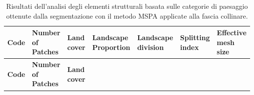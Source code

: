 \documentclass[
  a4paper,
]{book}
\begin{document}
\begin{longtable}[]{@{}
  >{\raggedright\arraybackslash}p{}
  >{\raggedright\arraybackslash}p{}
  >{\raggedright\arraybackslash}p{}
  >{\raggedright\arraybackslash}p{}
  >{\raggedright\arraybackslash}p{}
  >{\raggedright\arraybackslash}p{}
  >{\raggedright\arraybackslash}p{}@{}}
\caption{\label{tab:mspaCollina} Risultati dell'analisi degli elementi strutturali basata sulle categorie di paesaggio ottenute dalla segmentazione con il metodo MSPA applicate alla fascia collinare.}\tabularnewline
\toprule\noalign{}
\begin{minipage}[b]{\linewidth}\raggedright
\textbf{Code}
\end{minipage} & \begin{minipage}[b]{\linewidth}\raggedright
\textbf{Number of Patches}
\end{minipage} & \begin{minipage}[b]{\linewidth}\raggedright
\textbf{Land cover}
\end{minipage} & \begin{minipage}[b]{\linewidth}\raggedright
\textbf{Landscape Proportion}
\end{minipage} & \begin{minipage}[b]{\linewidth}\raggedright
\textbf{Landscape division}
\end{minipage} & \begin{minipage}[b]{\linewidth}\raggedright
\textbf{Splitting index}
\end{minipage} & \begin{minipage}[b]{\linewidth}\raggedright
\textbf{Effective mesh size}
\end{minipage} \\
\midrule\noalign{}
\endfirsthead
\toprule\noalign{}
\begin{minipage}[b]{\linewidth}\raggedright
\textbf{Code}
\end{minipage} & \begin{minipage}[b]{\linewidth}\raggedright
\textbf{Number of Patches}
\end{minipage} & \begin{minipage}[b]{\linewidth}\raggedright
\textbf{Land cover}
\end{minipage} & \begin{minipage}[b]{\linewidth}\raggedright

\end{minipage}
\end{longtable}
\end{document}
